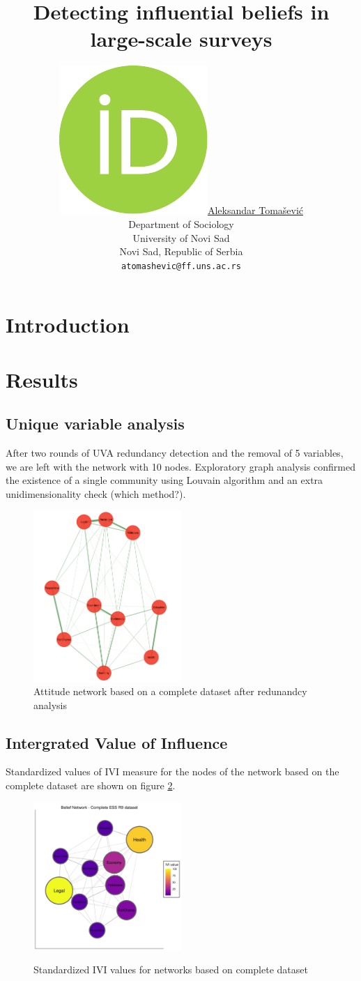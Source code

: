 \documentclass{article}
\title{Detecting influential beliefs in large-scale surveys}
\author{ \href{https://orcid.org/0000-0003-4863-6051}{\includegraphics[scale=0.06]{orcid.pdf}\hspace{1mm}Aleksandar Tomašević} \\
	Department of Sociology\\
	University of Novi Sad\\
	Novi Sad, Republic of Serbia\\
	\texttt{atomashevic@ff.uns.ac.rs}
}
\begin{document}
\maketitle

\section{Introduction}
\newpage
\section{Results}
\subsection{Unique variable analysis}

After two rounds of UVA redundancy detection
and the removal of 5 variables, we are left with the network with 10 nodes. Exploratory graph analysis confirmed the existence of a single community using Louvain algorithm and an extra unidimensionality check (which method?).

\begin{figure}[ht]
	\centering
	\label{fig:egafull}
	\includegraphics[width=0.5\textwidth]{figures/01-ega-full.png}
	\caption{Attitude network based on a complete dataset after redunandcy analysis}
\end{figure}

\subsection{Intergrated Value of Influence}

Standardized values of IVI measure for the nodes of the network based on the complete dataset are shown on figure \ref{fig:ivifull}.

\begin{figure}[ht]
	\centering
	\includegraphics[width=0.5\textwidth]{figures/02-ivi-full.png}
	\label{fig:ivifull}
	\caption{Standardized IVI values for networks based on complete dataset}
\end{figure}
\end{document}
